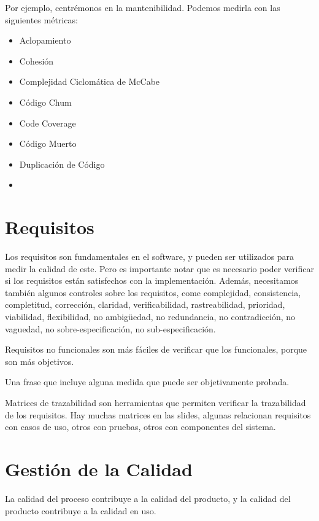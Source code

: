 Por ejemplo, centrémonos en la mantenibilidad. Podemos medirla con las siguientes métricas:
\begin{itemize}
   \item Aclopamiento
   \item Cohesión
   \item Complejidad Ciclomática de McCabe
   \item Código Chum
   \item Code Coverage
   \item Código Muerto
   \item Duplicación de Código
   \item 
\end{itemize}


\section{Requisitos}
Los requisitos son fundamentales en el software, y pueden ser utilizados para medir la calidad de este. 
Pero es importante notar que es necesario poder verificar si los requisitos están satisfechos con la implementación.
Además, necesitamos también algunos controles sobre los requisitos, come complejidad, consistencia, completitud, corrección, claridad, verificabilidad, rastreabilidad, prioridad, viabilidad, flexibilidad, no ambigüedad, no redundancia, no contradicción, no vaguedad, no sobre-especificación, no sub-especificación.

Requisitos no funcionales son más fáciles de verificar que los funcionales, porque son más objetivos.
\begin{definition}
   Una frase que incluye alguna medida que puede ser objetivamente probada.
\end{definition}

Matrices de trazabilidad son herramientas que permiten verificar la trazabilidad de los requisitos.
Hay muchas matrices en las slides, algunas relacionan requisitos con casos de uso, otros con pruebas, otros con componentes del sistema.


\section{Gestión de la Calidad}
La calidad del proceso contribuye a la calidad del producto, y la calidad del producto contribuye a la calidad en uso.



